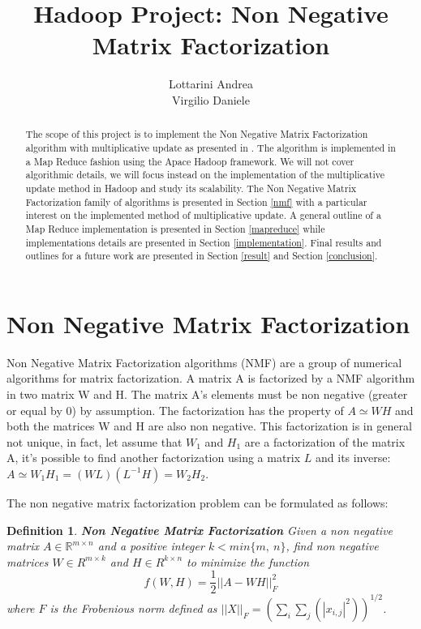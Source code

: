 \documentclass[a4paper,12pt]{article}
\title{Hadoop Project: Non Negative Matrix Factorization}
\author{Lottarini Andrea \\ Virgilio Daniele}
\newtheorem{mydef}{Definition}[section]
\begin{document}
\maketitle

\begin{abstract}

The scope of this project is to implement the Non Negative Matrix Factorization algorithm with multiplicative update as presented in \citep{liu2010}.
The algorithm is implemented in a Map Reduce fashion using the Apace Hadoop framework.
We will not cover algorithmic details, we will focus instead on the implementation of the multiplicative update method in Hadoop and study its scalability.
The Non Negative Matrix Factorization family of algorithms is presented in Section \ref{nmf} with a particular interest on the  implemented method of multiplicative update. 
A general outline of a Map Reduce implementation is presented in Section \ref{mapreduce} while implementations details are presented in Section \ref{implementation}.
Final results and outlines for a future work are presented in Section \ref{result} and Section \ref{conclusion}.

\end{abstract}

\section{Non Negative Matrix Factorization}
\label{nmf}

Non Negative Matrix Factorization algorithms (NMF) are a group of numerical algorithms for matrix factorization.
A matrix A is factorized by a NMF algorithm in two matrix W and H. 
The matrix A's elements must be non negative (greater or equal by 0) by assumption. 
The factorization has the property of $ A \simeq W H $ and both the matrices W and H are also non negative. 
This factorization is in general not unique, in fact, let assume that $W_1$ and $H_1$ are a factorization of the matrix A, it's possible to find another factorization using a matrix $L$ and its inverse: $A \simeq W_1 H_1 = ( W L ) (L^{-1} H) = W_2 H_2  $. 

The non negative matrix factorization problem can be formulated as follows:
\begin{mydef} \textbf{Non Negative Matrix Factorization}
  Given a non negative matrix $A \in \mathbb{R}^{m×n}$ and a positive integer $k<min\{m,~n\} $, find non 	
  	negative matrices $W \in R^{m×k}$ and $H \in R^{k×n}$ to minimize the function  
  	$$ f ( W , H ) = \frac{1}{2} || A − W H ||_F^2$$ where $F$ is the Frobenious norm defined as
  	$|| X ||_F = ( \sum_i \sum_j( |x_{i,j}|^2 ) )^{1/2}$. 
  	\label{def:nmf}
\end{mydef}
\end{document}
